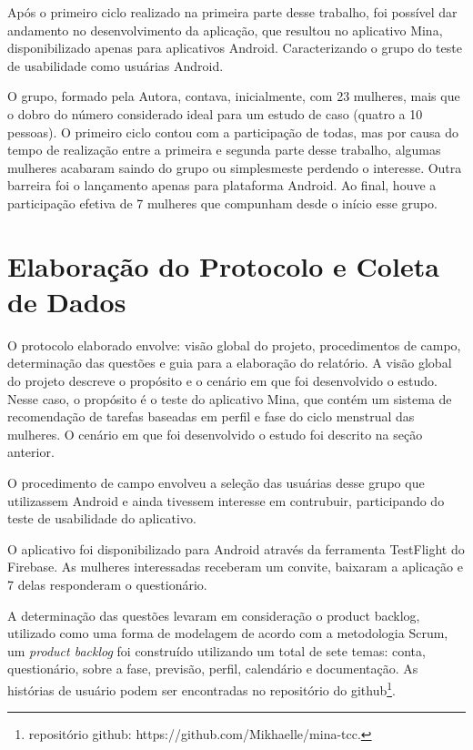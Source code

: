 Após o primeiro ciclo realizado na primeira parte desse trabalho, foi possível dar andamento no desenvolvimento da aplicação, 
que resultou no aplicativo Mina, disponibilizado apenas para aplicativos Android. Caracterizando o grupo do teste de usabilidade como 
usuárias Android.

O grupo, formado pela Autora, contava, inicialmente, com 23 mulheres, mais que o dobro do número considerado ideal 
para um estudo de caso (quatro a 10 pessoas). 
O primeiro ciclo contou com a participação de todas, mas por causa do tempo de realização entre a primeira e segunda parte desse trabalho, 
algumas mulheres acabaram saindo do grupo ou simplesmeste perdendo o interesse. Outra barreira foi o lançamento apenas para plataforma Android. 
Ao final, houve a participação efetiva de 7 mulheres que compunham desde o início esse grupo.


\section{Elaboração do Protocolo e Coleta de Dados}


O protocolo elaborado envolve: visão global do projeto, procedimentos de campo, determinação das questões e guia para a elaboração do relatório.
A visão global do projeto descreve o propósito e o cenário em que foi desenvolvido o estudo. Nesse caso, o propósito é o teste do aplicativo Mina, que contém 
um sistema de recomendação de tarefas baseadas 
em perfil e fase do ciclo menstrual das mulheres. O cenário em que foi desenvolvido o estudo foi descrito na seção anterior.

O procedimento de campo envolveu a seleção das usuárias desse grupo que utilizassem Android e ainda tivessem interesse em contrubuir, participando 
do teste de usabilidade do aplicativo.

O aplicativo foi disponibilizado para Android através da ferramenta TestFlight do Firebase. As mulheres interessadas receberam um convite, 
baixaram a aplicação e 7 
delas responderam o questionário. 

A determinação das questões levaram em consideração o product backlog, utilizado como uma 
forma de modelagem de acordo com a metodologia Scrum, 
um \emph{product backlog} foi construído utilizando um total de 
sete temas: conta, questionário, sobre a fase, previsão, perfil, 
calendário e documentação. As histórias de usuário podem ser 
encontradas no repositório do github\footnote{repositório github: https://github.com/Mikhaelle/mina-tcc.}.

